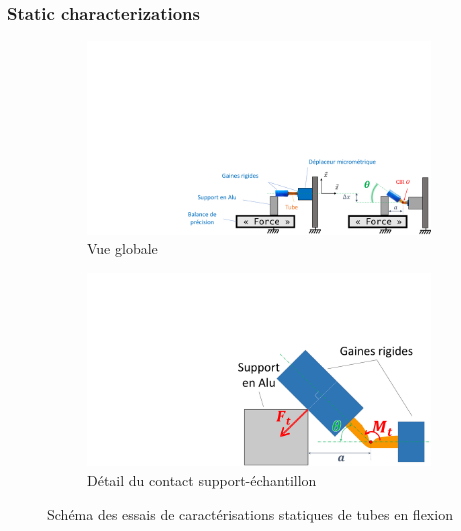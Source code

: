 \documentclass[3p,twocolumn,preprint]{elsarticle}
\def \hfillx {\hspace*{ -\linewidth} \hfill} %
\begin{document}
			\subsubsection{Static characterizations}
			\label{Static characterizations of HV}
\begin{figure}[!htb]
	\begin{center}
		\begin{subfigure}[t]{0.69\textwidth}
			\captionsetup{justification=centering}
			\includegraphics[trim={9.8cm 0cm 0cm 11cm},clip,width=\textwidth]{figures/essais_statique_VH.pdf}
			\caption{Vue globale}
			\label{fig:essais_statique_VH}
		\end{subfigure}
		\hfillx
		\begin{subfigure}[t]{0.29\textwidth}
			\captionsetup{justification=centering}
			\includegraphics[trim={14cm 0cm 0cm 7cm},clip,width=\textwidth]{figures/essais_statique_detail.pdf}
			\caption{Détail du contact support-échantillon}
			\label{fig:essais_statique_detail}
		\end{subfigure}
		\caption{Schéma des essais de caractérisations statiques de tubes en flexion}
		\label{fig:essais_statique_total}
	\end{center}
\end{figure}
\end{document}
